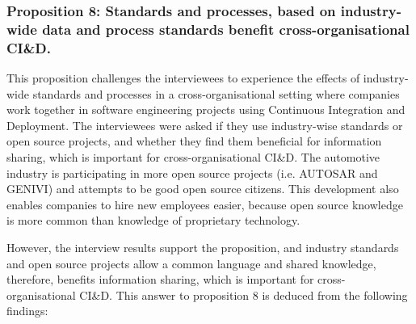


\subsubsection{Proposition 8: Standards and processes, based on industry-wide data and process standards benefit cross-organisational CI\&D.}

This proposition challenges the interviewees to experience the effects of industry-wide standards and processes in a cross-organisational setting where companies work together in software engineering projects using Continuous Integration and Deployment. The interviewees were asked if they use industry-wise standards or open source projects, and whether they find them beneficial for information sharing, which is important for cross-organisational CI\&D. The automotive industry is participating in more open source projects (i.e. AUTOSAR and GENIVI) and attempts to be good open source citizens. This development also enables companies to hire new employees easier, because open source knowledge is more common than knowledge of proprietary technology.

However, the interview results support the proposition, and industry standards and open source projects allow a common language and shared knowledge, therefore, benefits information sharing, which is important for cross-organisational CI\&D. This answer to proposition 8 is deduced from the following findings:

